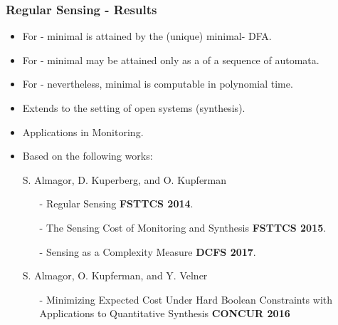 \begin{frame}
	\frametitle{Regular Sensing - Results}
	\begin{itemize}
		\item<+-> For  - minimal  is attained by the (unique) minimal- DFA.
		\item<+-> For  - minimal  may be attained only as a  of a sequence of automata.
		\item<+-> For  - nevertheless, minimal  is computable in polynomial time.
		\item<+-> Extends to the setting of open systems (synthesis).
		\item<+-> Applications in Monitoring.
		\item<+-> Based on the following works:\\
		{\footnotesize S. Almagor, D. Kuperberg, and O. Kupferman
		\begin{itemize}
			\item[-] {\footnotesize Regular Sensing \textbf{FSTTCS 2014}.}
			\item[-] {\footnotesize The Sensing Cost of
				Monitoring and Synthesis \textbf{FSTTCS 2015}.}
			\item[-] {\footnotesize Sensing as a Complexity
				Measure \textbf{DCFS 2017}.}
		\end{itemize}
		{\footnotesize S. Almagor, O. Kupferman, and Y. Velner
		\begin{itemize}
			\item[-] {\footnotesize Minimizing Expected Cost	Under Hard Boolean Constraints with Applications to Quantitative Synthesis \textbf{CONCUR 2016}}	
		\end{itemize}}}
		
	\end{itemize}
\end{frame}